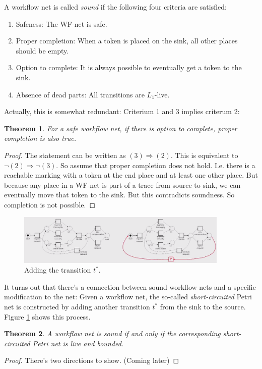 \documentclass[12pt, a4paper]{article}
\newtheorem{theorem}{Theorem}[section]
\numberwithin{equation}{section}
\begin{document}
A workflow net is called \textit{sound} if the following four criteria are satisfied:
\begin{enumerate}
\item Safeness: The WF-net is safe.
\item Proper completion: When a token is placed on the sink, all other places should be empty.
\item Option to complete: It is always possible to eventually get a token to the sink.
\item Absence of dead parts: All transitions are $L_1$-live.
\end{enumerate}
Actually, this is somewhat redundant: Criterium 1 and 3 implies criterum 2:

\begin{theorem}
For a safe workflow net, if there is option to complete, proper completion is also true.
\end{theorem}
\begin{proof}
The statement can be written as $(3)\Rightarrow(2)$. This is equivalent to $\neg (2)\Rightarrow\neg (3)$. So assume that proper completion does not hold. I.e. there is a reachable marking with a token at the end place and at least one other place. But because any place in a WF-net is part of a trace from source to sink, we can eventually move that token to the sink. But this contradicts soundness. So completion is not possible.
\end{proof}

\begin{figure}
\centering
\includegraphics[width=0.9\textwidth]{wf_theorem}
\caption{Adding the transition $t^*$.}
\label{fig:wf_theorem}
\end{figure}

It turns out that there's a connection between sound workflow nets and a specific modification to the net: Given a workflow net, the so-called \textit{short-circuited} Petri net is constructed by adding another transition $t^*$ from the sink to the source. Figure \ref{fig:wf_theorem} shows this process.

\begin{theorem}
A workflow net is sound if and only if the corresponding short-circuited Petri net is live and bounded.
\end{theorem}
\begin{proof}
There's two directions to show. (Coming later)
\end{proof}
\end{document}
